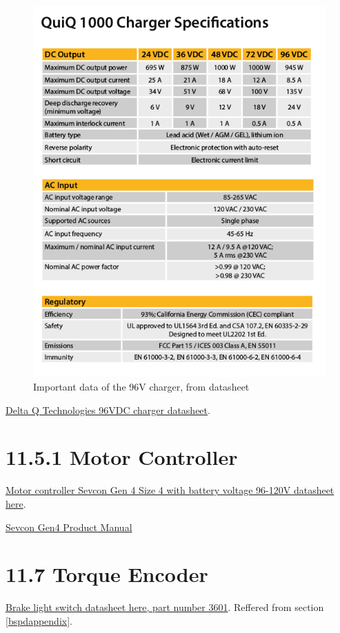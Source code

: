 \documentclass{article}
\begin{document}
\begin{figure}[H]
    \centering
    \includegraphics[width = 0.8 \textwidth]{chargerdata}
    \caption{Important data of the 96V charger, from datasheet}
    \label{chargerdatasheet}
\end{figure}

\href{http://delta-q.com/wp-content/uploads/2015/12/Delta-Q_QuiQ1000_BatteryCharger_Specifications.pdf}{Delta Q Technologies 96VDC charger datasheet}.

\section*{11.5.1 Motor Controller}

\href{http://www.sevcon.com/media/2461/Gen4\%20Aug\%202013\%20web.pdf}{Motor controller Sevcon Gen 4 Size 4 with battery voltage 96-120V datasheet here}.

\href{http://www.thunderstruck-ev.com/Manuals/Gen4_Product_Manual_V3.0.pdf}{Sevcon Gen4 Product Manual}

\section*{11.7 Torque Encoder} \label{torqueappendix}

\href{https://www.pegasusautoracing.com/2015/086.pdf}{Brake light switch datasheet here, part number 3601}. Reffered from section \ref{bspdappendix}.
\end{document}
